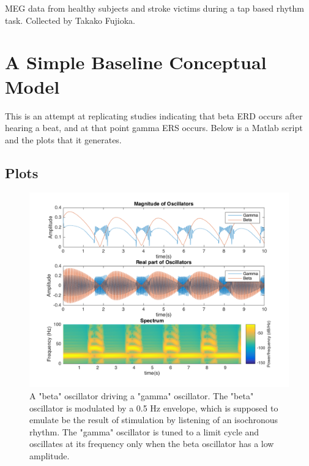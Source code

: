 \documentclass[usletter,12pt]{article} %
\begin{document}
\noindent
MEG data from healthy subjects and stroke victims during a tap based rhythm task.  Collected by Takako Fujioka. \cite{fujioka2009beta}  \cite{jamali2014neuromagnetic}



\section{A Simple Baseline Conceptual Model}

\noindent
This is an attempt at replicating studies indicating that beta ERD occurs after hearing a beat, and at that point gamma ERS occurs.  Below is a Matlab script and the plots that it generates.  

\subsection{Plots}

\begin{figure}[H]
\centering
\includegraphics[scale=0.275]{images/simple_model}
\caption{A "beta" oscillator driving a "gamma" oscillator. The "beta" oscillator is modulated by a 0.5 Hz envelope, which is supposed to emulate be the result of stimulation by listening of an isochronous rhythm. The "gamma" oscillator is tuned to a limit cycle and oscillates at its frequency only when the beta oscillator has a low amplitude.}
\label{fig:simple_model}
\end{figure}
\end{document}
